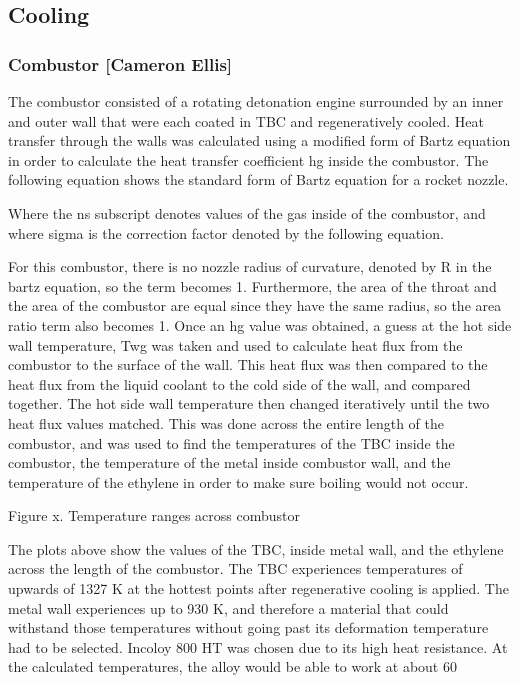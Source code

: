 \subsection{Cooling}
\subsubsection{Combustor [Cameron Ellis]}

The combustor consisted of a rotating detonation engine surrounded by an inner and outer wall that were each coated in TBC and regeneratively cooled. Heat transfer through the walls was calculated using a modified form of Bartz equation in order to calculate the heat transfer coefficient hg inside the combustor. The following equation shows the standard form of Bartz equation for a rocket nozzle.

Where the ns subscript denotes values of the gas inside of the combustor, and where sigma is the correction factor denoted by the following equation.

For this combustor, there is no nozzle radius of curvature, denoted by R in the bartz equation, so the term  becomes 1. Furthermore, the area of the throat and the area of the combustor are equal since they have the same radius, so the area ratio term  also becomes 1. Once an hg value was obtained, a guess at the hot side wall temperature, Twg was taken and used to calculate heat flux from the combustor to the surface of the wall. This heat flux was then compared to the heat flux from the liquid coolant to the cold side of the wall, and compared together. The hot side wall temperature then changed iteratively until the two heat flux values matched. This was done across the entire length of the combustor, and was used to find the temperatures of the TBC inside the combustor, the temperature of the metal inside combustor wall, and the temperature of the ethylene in order to make sure boiling would not occur.


Figure x. Temperature ranges across combustor

The plots above show the values of the TBC, inside metal wall, and the ethylene across the length of the combustor. The TBC experiences temperatures of upwards of 1327 K at the hottest points after regenerative cooling is applied. The metal wall experiences up to 930 K, and therefore a material that could withstand those temperatures without going past its deformation temperature had to be selected. Incoloy 800 HT was chosen due to its high heat resistance. At the calculated temperatures, the alloy would be able to work at about 60%

